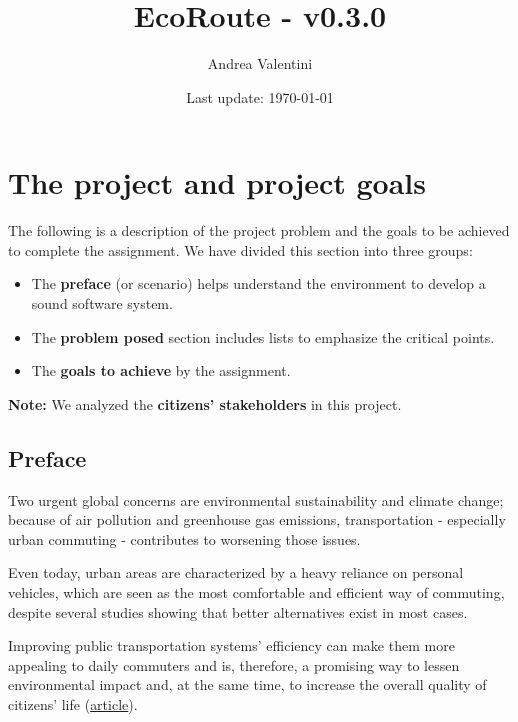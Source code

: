 \documentclass[a4paper]{article}
\newcommand{\highspace}{\vspace{1.2em}\noindent}
\begin{document}
    \author{Andrea Valentini}
    \title{EcoRoute - v0.3.0}
    \date{Last update: \today}
    \maketitle

    \newpage

    \tableofcontents

    \newpage

    \pagestyle{fancy}
    \fancyhead{} %
    \fancyhead[R]{\nouppercase{\leftmark\hfill\rightmark}}

    \section{The project and project goals}

    The following is a description of the project problem and the goals to be achieved to complete the assignment. We have divided this section into three groups:
    \begin{itemize}
        \item The \textbf{preface} (or scenario) helps understand the environment to develop a sound software system.

        \item The \textbf{problem posed} section includes lists to emphasize the critical points.

        \item The \textbf{goals to achieve} by the assignment.
    \end{itemize}
    \textbf{Note:} We analyzed the \textbf{citizens' stakeholders} in this project. 

    \subsection*{Preface}

    Two urgent global concerns are environmental sustainability and climate change; because of air pollution and greenhouse gas emissions, transportation - especially urban commuting - contributes to worsening those issues.

    \highspace
    Even today, urban areas are characterized by a heavy reliance on personal vehicles, which are seen as the most comfortable and efficient way of commuting, despite several studies showing that better alternatives exist in most cases.

    \highspace
    Improving public transportation systems' efficiency can make them more appealing to daily commuters and is, therefore, a promising way to lessen environmental impact and, at the same time, to increase the overall quality of citizens' life (\href{https://journals.plos.org/plosone/article?id=10.1371/journal.pone.0223650}{article}).
\end{document}
